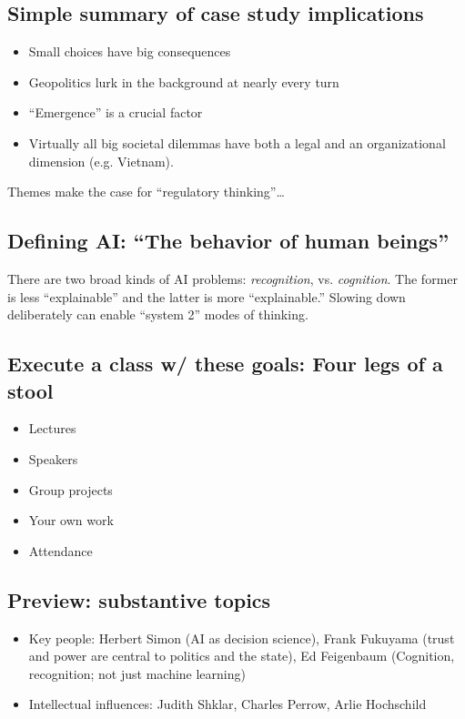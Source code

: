 \documentclass{article}
\begin{document}
\subsection{Simple summary of case study implications}
\begin{itemize}
  \item Small choices have big consequences
  \item Geopolitics lurk in the background at nearly every turn
  \item ``Emergence'' is a crucial factor
  \item Virtually all big societal dilemmas have both a legal and an organizational dimension (e.g. Vietnam).
\end{itemize}

Themes make the case for ``regulatory thinking''\dots

\subsection{Defining AI: ``The behavior of human beings''}

There are two broad kinds of AI problems: {\it recognition}, vs. {\it cognition}.  The former is less ``explainable'' and the latter is more ``explainable.''  Slowing down deliberately can enable ``system 2'' modes of thinking.


\subsection{Execute a class w/ these goals: Four legs of a stool}

\begin{itemize}
  \item Lectures
  \item Speakers
  \item Group projects
  \item Your own work
  \item Attendance
\end{itemize}

\subsection{Preview: substantive topics}
\begin{itemize}
  \item Key people: Herbert Simon (AI as decision science), Frank Fukuyama (trust and power are central to politics and the state), Ed Feigenbaum (Cognition, recognition; not just machine learning)
  \item Intellectual influences: Judith Shklar, Charles Perrow, Arlie Hochschild
\end{itemize}
\end{document}
